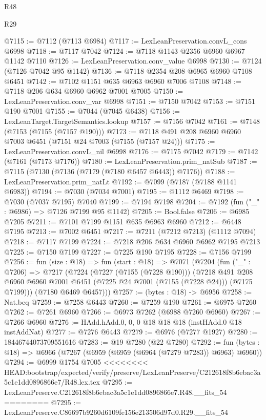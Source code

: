 \begin{lexlean}{R48}
\begin{lexlean}{R29}
\begin{coremodule}
{{{{{{{{{{{{{{{{{{{{{{{{{{{{{{{{{{{{{{{{{{{{{{{{{{{{{{{{{{{{{{{{{{{{{{{{{{{{{{{{{{{{{{{{{{{{{{{{{{{{{{{{{{{{{{{{{{{{{{{{{{{{{{{{{{{{{{{{{{{{{{{{{{{{{{{{{{{{{{{{{{{{{{{{{{{{{{{{{{{{{{{{{{{{{{{{{{{{{{{{{{{{{{{{{{{{{{{{{{@7115 := @7112 (@7113 @6984)
@7117 := LexLeanPreservation.convL_cons @6998
@7118 := @7117 @7042
@7124 := @7118 @1143 @2356 @6960 @6967 @1142 @7110
@7126 := LexLeanPreservation.conv_value @6998
@7130 := @7124 (@7126 @7042 @95 @1142)
@7136 := @7118 @2354 @208 @6965 @6960 @7108 @6451
@7142 := @7102 @1151 @635 @6963 @6960 @7006 @7108
@7148 := @7118 @206 @634 @6960 @6962 @7001 @7005
@7150 := LexLeanPreservation.conv_var @6998
@7151 := @7150 @7042
@7153 := @7151 @190 @7001
@7155 := @7044 (@7045 @6438)
@7156 := LexLeanTarget.TargetSemantics.lookup
@7157 := @7156 @7042
@7161 := @7148 (@7153 (@7155 (@7157 @190)))
@7173 := @7118 @491 @208 @6960 @6960 @7003 @6451 (@7151 @24 @7003 (@7155 (@7157 @24)))
@7175 := LexLeanPreservation.convL_nil @6998
@7176 := @7175 @7042
@7179 := @7142 (@7161 (@7173 @7176))
@7180 := LexLeanPreservation.prim_natSub
@7187 := @7115 (@7130 (@7136 (@7179 (@7180 @6457 @6443)) @7176))
@7188 := LexLeanPreservation.prim_natLt
@7192 := @7099 (@7187 (@7188 @1141 @6983))
@7194 := @7030 (@7034 @7001)
@7195 := @1112 @6469
@7198 := @7030 (@7037 @7195) @7040
@7199 := @7194 @7198
@7204 := @7192 (fun ("_" : @6986) => @7126 @7199 @95 @1142)
@7205 := Bool.false
@7206 := @6985 @7205
@7211 := @7101 @7199 @1151 @635 @6963 @6960
@7212 := @6448 @7195
@7213 := @7002 @6451
@7217 := @7211 (@7212 @7213) (@1112 @7094)
@7218 := @7117 @7199
@7224 := @7218 @206 @634 @6960 @6962 @7195 @7213
@7225 := @7150 @7199
@7227 := @7225 @190 @7195
@7228 := @7156 @7199
@7256 := fun (size : @18) =>
  fun (start : @18) =>
  @7071
    (@7204
      (fun ("_" : @7206) =>
      @7217
        (@7224
          (@7227 (@7155 (@7228 @190)))
          (@7218
            @491
            @208
            @6960
            @6960
            @7001
            @6451
            (@7225 @24 @7001 (@7155 (@7228 @24)))
            (@7175 @7199)))
        (@7180 @6469 @6457)))
@7257 := (bytes : @18) -> @6956
@7258 := Nat.beq
@7259 := @7258 @6443
@7260 := @7259 @190
@7261 := @6975 @7260
@7262 := @7261 @6960
@7266 := @6973 @7262 (@6988 @7260 @6960)
@7267 := @7266 @6960
@7276 := HAdd.hAdd.{0, 0, 0} @18 @18 @18 (instHAdd.{0} @18 instAddNat)
@7277 := @7276 @6443
@7279 := @6976 (@7277 @1927)
@7280 := 18446744073709551616
@7283 := @19 @7280 (@22 @7280)
@7292 := fun (bytes : @18) => @6966 (@7267 (@6959 (@6959 (@6964 (@7279 @7283)) @6963) @6960))
@7294 := @6999 @1754 @7005
<<<<<<<< HEAD:bootstrap/expected/verify/preserve/LexLeanPreserve/C212618f8b6ebac3a5c1e1dd0896866e7/R48.lex.tex
@7295 := LexLeanPreserve.C212618f8b6ebac3a5c1e1dd0896866e7.R48.__fits_54
========
@7295 := LexLeanPreserve.C86697b9260d6109fe156e213506d97d0.R29.__fits_54
}}}}}}}}}}}}}}}}}}}}}}}}}}}}}}}}}}}}}}}}}}}}}}}}}}}}}}}}}}}}}}}}}}}}}}}}}}}}}}}}}}}}}}}}}}}}}}}}}}}}}}}}}}}}}}}}}}}}}}}}}}}}}}}}}}}}}}}}}}}}}}}}}}}}}}}}}}}}}}}}}}}}}}}}}}}}}}}}}}}}}}}}}}}}}}}}}}}}}}}}}}}}}}}}}}}}}}}}}}
\end{coremodule}
\end{lexlean}
\end{lexlean}

